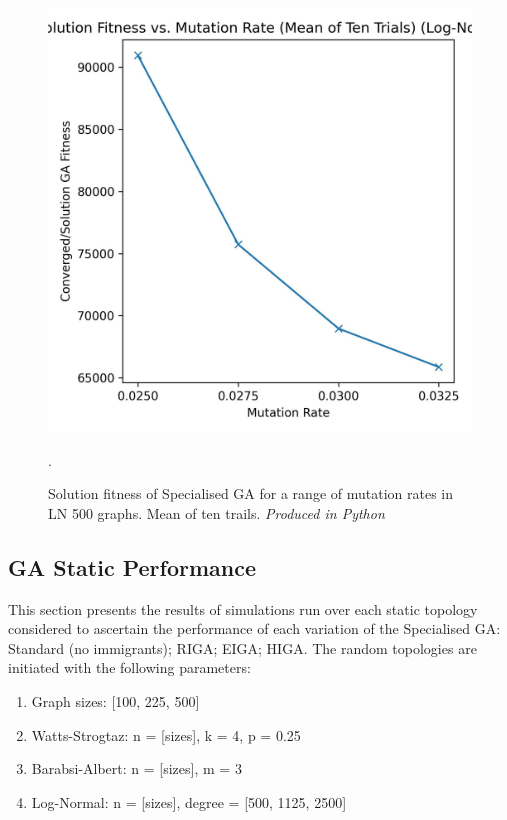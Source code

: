 \documentclass[
	a4paper, %
	10pt, %
	unnumberedsections, %
	twoside, %
]{LTJournalArticle}
\begin{document}
\begin{figure}[H]
	\includegraphics[width=\linewidth]{Figures/sims/mutation/mutation_v_fitness.jpg}
	\caption{Solution fitness of Specialised GA for a range of mutation rates in LN 500 graphs. Mean of ten trails.  \emph{Produced in Python}}. 
	\label{fig:mutation_v_fitness}
\end{figure}

\subsection{GA Static Performance}

This section presents the results of simulations run over each static topology considered to ascertain the performance of each variation of the Specialised GA: Standard (no immigrants); RIGA; EIGA; HIGA. The random topologies are initiated with the following parameters: 
\begin{enumerate}
	\item Graph sizes: [100, 225, 500] 
	\item Watts-Strogtaz: n = [sizes], k = 4, p = 0.25 
	\item Barabsi-Albert: n = [sizes], m = 3 
	\item Log-Normal: n = [sizes], degree = [500, 1125, 2500] 
\end{enumerate}
\end{document}
